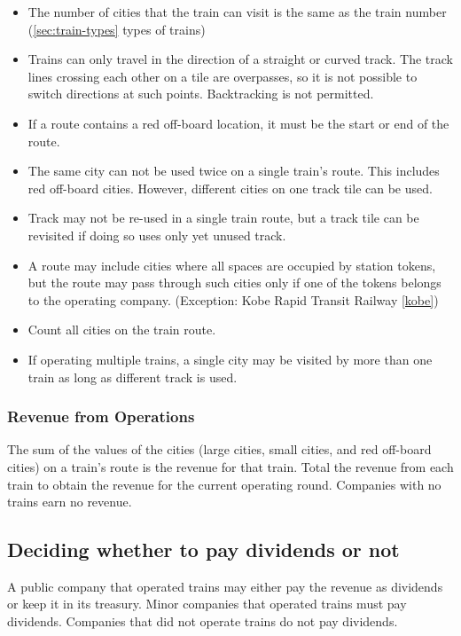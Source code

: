 \documentclass{article}
\begin{document}
\begin{CJK}{UTF8}{min}
\begin{multicols}{2}
\begin{itemize}
\item The number of cities that the train can visit is the same as the
  train number (\autoref{sec:train-types} types of trains)

\item Trains can only travel in the direction of a straight or curved
  track. The track lines crossing each other on a tile are overpasses,
  so it is not possible to switch directions at such
  points. Backtracking is not permitted.

\item If a route contains a red off-board location, it must be the start
  or end of the route.

\item The same city can not be used twice on a single train's
  route. This includes red off-board cities. However, different cities on one
  track tile can be used.

\item Track may not be re-used in a single train route, but a
  track tile can be revisited if doing so uses only yet unused track.

\item A route may include cities where all spaces are occupied by
  station tokens, but the route may pass through such cities only if
  one of the tokens belongs to the operating company. (Exception: Kobe
  Rapid Transit Railway \ref{kobe})

\item Count all cities on the train route.

\item If operating multiple trains, a single city may be visited by
  more than one train as long as different track is used.
\end{itemize}

\subsubsection{Revenue from Operations}
The sum of the values of the cities (large cities, small cities, and
red off-board cities) on a train's route is the revenue for that
train. Total the revenue from each train to obtain the revenue for the
current operating round. Companies with no trains earn no revenue.

\subsection{Deciding whether to pay dividends or not}
A public company that operated trains may either pay the revenue as
dividends or keep it in its treasury. Minor companies that operated
trains must pay dividends. Companies that did not operate trains do
not pay dividends.


\end{multicols}
\end{CJK}
\end{document}
